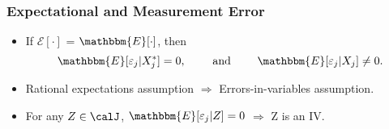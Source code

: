 \begin{frame}
\frametitle{Expectational and Measurement Error}

\begin{itemize}
	\item If $\mathcal{E}[\cdot]$ = $\mathbbm{E}[\cdot]$, then
	\begin{equation*}
	\mathbbm{E}[\varepsilon_{j}|X^{*}_{j}]=0,\qquad\text{ and }\qquad\mathbbm{E}[\varepsilon_{j}|X_{j}]\neq0.
	\end{equation*}
	\item Rational expectations assumption $\Longrightarrow$ Errors-in-variables assumption.
	\item For any $Z\in\calJ$, $\mathbbm{E}[\varepsilon_{j}|Z]=0$ $\Longrightarrow$ Z is an IV.
\end{itemize}
\end{frame}

